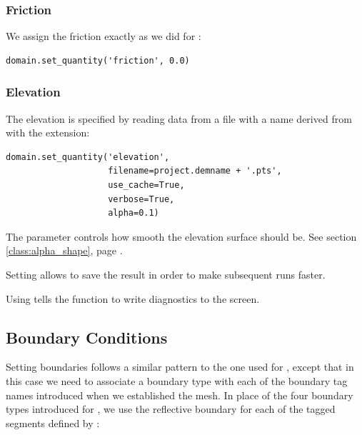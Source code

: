 \documentclass{manual}
\begin{document}
\subsubsection{Friction}

We assign the friction exactly as we did for :

\begin{verbatim}
domain.set_quantity('friction', 0.0)
\end{verbatim}

\subsubsection{Elevation}

The elevation is specified by reading data from a file with a name derived from
 with the  extension:

\begin{verbatim}
domain.set_quantity('elevation',
                    filename=project.demname + '.pts',
                    use_cache=True,
                    verbose=True,
                    alpha=0.1)
\end{verbatim}

The  parameter controls how smooth the elevation surface
should be.  See section \ref{class:alpha_shape}, page \pageref{class:alpha_shape}.

Setting  allows \anuga to save the result in order
to make subsequent runs faster.

Using  tells the function to write diagnostics to
the screen.

\subsection{Boundary Conditions}

Setting boundaries follows a similar pattern to the one used for
, except that in this case we need to associate a
boundary type with each of the
boundary tag names introduced when we established the mesh. In place of the four
boundary types introduced for , we use the reflective
boundary for each of the tagged segments defined by :
\end{document}
